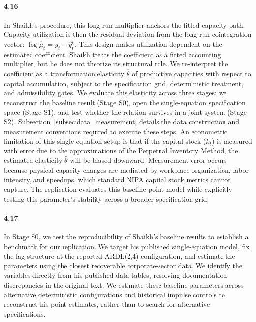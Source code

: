 \paragraph{4.16}
In Shaikh's procedure, this long-run multiplier anchors the fitted capacity path. Capacity utilization is then the residual deviation from the long-run cointegration vector: $\log \hat{\mu}_t = y_t - \hat{y}^p_t$. This design makes utilization dependent on the estimated coefficient. Shaikh treats the coefficient as a fitted accounting multiplier, but he does not theorize its structural role. We re-interpret the coefficient as a transformation elasticity $\hat{\theta}$ of productive capacities with respect to capital accumulation, subject to the specification grid, deterministic treatment, and admissibility gates. We evaluate this elasticity across three stages: we reconstruct the baseline result (Stage S0), open the single-equation specification space (Stage S1), and test whether the relation survives in a joint system (Stage S2). Subsection~\ref{subsec:data_measurement} details the data construction and measurement conventions required to execute these steps. An econometric limitation of this single-equation setup is that if the capital stock ($k_t$) is measured with error due to the approximations of the Perpetual Inventory Method, the estimated elasticity $\hat{\theta}$ will be biased downward. Measurement error occurs because physical capacity changes are mediated by workplace organization, labor intensity, and speedups, which standard NIPA capital stock metrics cannot capture. The replication evaluates this baseline point model while explicitly testing this parameter's stability across a broader specification grid.

\paragraph{4.17}
In Stage S0, we test the reproducibility of Shaikh's baseline results to establish a benchmark for our replication. We target his published single-equation model, fix the lag structure at the reported ARDL(2,4) configuration, and estimate the parameters using the closest recoverable corporate-sector data. We identify the variables directly from his published data tables, resolving documentation discrepancies in the original text. We estimate these baseline parameters across alternative deterministic configurations and historical impulse controls to reconstruct his point estimates, rather than to search for alternative specifications.

